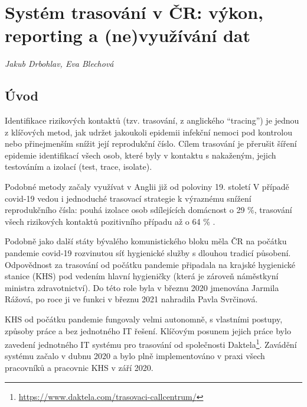 \chapter{Systém trasování v ČR: výkon, reporting a (ne)využívání dat}\label{Trasovani}

\textit{Jakub Drbohlav, Eva Blechová}
\vspace{15mm}

\section*{Úvod}

Identifikace rizikových kontaktů (tzv. trasování, z anglického “tracing”) je jednou z klíčových metod, jak udržet jakoukoli epidemii infekční nemoci pod kontrolou nebo přinejmenším snížit její reprodukční číslo. Cílem trasování je přerušit šíření epidemie identifikací všech osob, které byly v kontaktu s nakaženým, jejich testováním a izolací (test, trace, isolate).

Podobné metody začaly využívat v Anglii již od poloviny 19. století \cite{pg:mooney2020} V případě covid-19 vedou i jednoduché trasovací strategie k výraznému snížení reprodukčního čísla: pouhá izolace osob sdílejících domácnost o 29 \%, trasování všech rizikových kontaktů pozitivního případu až o 64 \% \cite{pg:kucharski2020}.

Podobně jako další státy bývalého komunistického bloku měla ČR na počátku pandemie covid-19 rozvinutou síť hygienické služby s dlouhou tradicí působení. Odpovědnost za trasování od počátku pandemie připadala na krajské hygienické stanice (KHS) pod vedením hlavní hygieničky (která je zároveň náměstkyní ministra zdravotnictví). Do této role byla v březnu 2020 jmenována Jarmila Rážová, po roce ji ve funkci v březnu 2021 nahradila Pavla Svrčinová.

KHS od počátku pandemie fungovaly velmi autonomně, s vlastními postupy, způsoby práce a bez jednotného IT řešení. Klíčovým posunem jejich práce bylo zavedení jednotného IT systému pro trasování od společnosti Daktela\footnote{\url{https://www.daktela.com/trasovaci-callcentrum/}}. Zavádění systému začalo v dubnu 2020 a bylo plně implementováno v praxi všech pracovníků a pracovnic KHS v září 2020.

